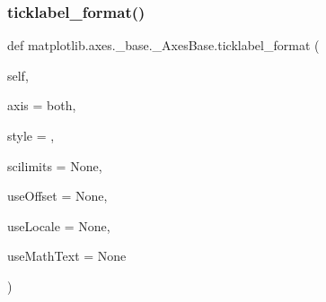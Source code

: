 \subsubsection{\texorpdfstring{ticklabel\+\_\+format()}{ticklabel\_format()}}
{\footnotesize\ttfamily def matplotlib.\+axes.\+\_\+base.\+\_\+\+Axes\+Base.\+ticklabel\+\_\+format (\begin{DoxyParamCaption}\item[{}]{self,  }\item[{}]{axis = {\ttfamily \textquotesingle{}both\textquotesingle{}},  }\item[{}]{style = {\ttfamily \textquotesingle{}\textquotesingle{}},  }\item[{}]{scilimits = {\ttfamily None},  }\item[{}]{use\+Offset = {\ttfamily None},  }\item[{}]{use\+Locale = {\ttfamily None},  }\item[{}]{use\+Math\+Text = {\ttfamily None} }\end{DoxyParamCaption})}

